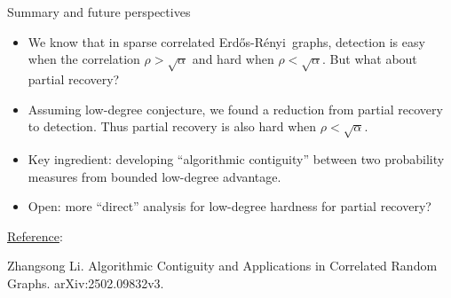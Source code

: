 \documentclass{beamer}
\theoremstyle{plain}
\theoremstyle{definition}
\newcommand{\ER}{Erd\H{o}s-R\'{e}nyi\ }
\begin{document}
\begin{frame}{Summary and future perspectives}

\begin{itemize}
    \item We know that in sparse correlated \ER graphs, detection is easy when the correlation $\rho>\sqrt{\alpha}$ and hard when $\rho<\sqrt{\alpha}$. But what about partial recovery?
    \item Assuming low-degree conjecture, we found a reduction from partial recovery to detection. Thus partial recovery is also hard when $\rho<\sqrt{\alpha}$.
    \item Key ingredient: developing ``algorithmic contiguity'' between two probability measures from bounded low-degree advantage.
    \item Open: more ``direct'' analysis for low-degree hardness for partial recovery?
\end{itemize}

\underline{Reference}: 

Zhangsong Li. Algorithmic Contiguity and Applications in Correlated Random Graphs. arXiv:2502.09832v3.



\end{frame}
















\end{document}
